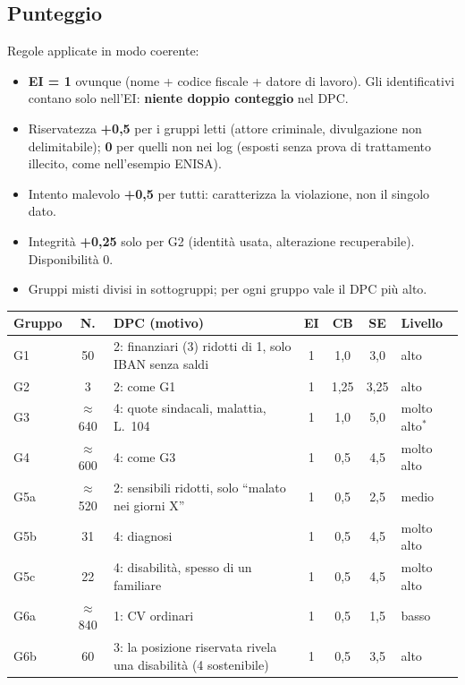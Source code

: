 \subsection{Punteggio}
Regole applicate in modo coerente:
\begin{itemize}
  \item \textbf{EI = 1} ovunque (nome + codice fiscale + datore di lavoro). Gli identificativi
    contano solo nell'EI: \textbf{niente doppio conteggio} nel DPC.
  \item Riservatezza \textbf{+0,5} per i gruppi letti (attore criminale, divulgazione non
    delimitabile); \textbf{0} per quelli non nei log (esposti senza prova di trattamento illecito,
    come nell'esempio ENISA).
  \item Intento malevolo \textbf{+0,5} per tutti: caratterizza la violazione, non il singolo dato.
  \item Integrità \textbf{+0,25} solo per G2 (identità usata, alterazione recuperabile). Disponibilità 0.
  \item Gruppi misti divisi in sottogruppi; per ogni gruppo vale il DPC più alto.
\end{itemize}

\begin{center}
\small
\begin{tabularx}{\linewidth}{l c X c c c l}
\toprule
\textbf{Gruppo} & \textbf{N.} & \textbf{DPC (motivo)} & \textbf{EI} & \textbf{CB} & \textbf{SE} &
  \textbf{Livello} \\ \midrule
G1 & 50 & 2: finanziari (3) ridotti di 1, solo IBAN senza saldi & 1 & 1,0 & 3,0 & alto \\
G2 & 3 & 2: come G1 & 1 & 1,25 & 3,25 & alto \\
G3 & $\approx$640 & 4: quote sindacali, malattia, L.~104 & 1 & 1,0 & 5,0 & molto alto$^{*}$ \\
G4 & $\approx$600 & 4: come G3 & 1 & 0,5 & 4,5 & molto alto \\
G5a & $\approx$520 & 2: sensibili ridotti, solo ``malato nei giorni X'' & 1 & 0,5 & 2,5 & medio \\
G5b & 31 & 4: diagnosi & 1 & 0,5 & 4,5 & molto alto \\
G5c & 22 & 4: disabilità, spesso di un familiare & 1 & 0,5 & 4,5 & molto alto \\
G6a & $\approx$840 & 1: CV ordinari & 1 & 0,5 & 1,5 & basso \\
G6b & 60 & 3: la posizione riservata rivela una disabilità (4 sostenibile) & 1 & 0,5 & 3,5 & alto \\
\bottomrule
\end{tabularx}
\end{center}

